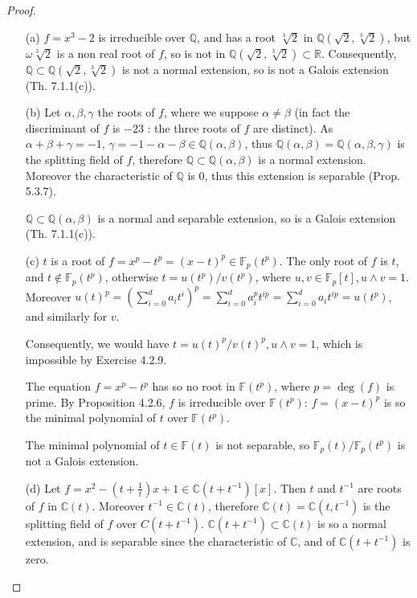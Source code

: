 \documentclass[11pt,a4paper]{article}
\newcommand{\Q}{\mathbb{Q}}
\newcommand{\R}{\mathbb{R}}
\newcommand{\C}{\mathbb{C}}
\newcommand{\F}{\mathbb{F}}
\begin{document}
\begin{proof}
\begin{enumerate}
\item[(a)]
$f = x^3-2$ is  irreducible over $\Q$, and has a root $\sqrt[3]{2}$ in $\Q(\sqrt{2},\sqrt[3]{2})$, but $\omega \sqrt[3]{2}$ is a non real root of $f$, so is not in $\Q(\sqrt{2},\sqrt[3]{2}) \subset \R$. Consequently, $\Q \subset \Q(\sqrt{2},\sqrt[3]{2})$ is not a normal extension, so is not a Galois extension (Th. 7.1.1(c)).

\item[(b)]
Let  $\alpha,\beta,\gamma$ the roots of $f$, where we suppose $\alpha \neq \beta $ (in fact the discriminant of $f$ is $-23$ : the three roots of $f$ are distinct). As $\alpha+\beta+\gamma = -1$, $\gamma = -1 - \alpha - \beta \in \Q(\alpha,\beta)$, thus $\Q(\alpha,\beta) = \Q(\alpha,\beta,\gamma)$ is the splitting field of $f$, therefore  $\Q \subset \Q(\alpha,\beta)$ is a normal extension. Moreover the characteristic of $\Q$ is 0, thus this extension is separable (Prop. 5.3.7).

$\Q \subset \Q(\alpha,\beta)$ is a normal and separable extension, so is a Galois extension (Th. 7.1.1(c)).

\item[(c)]$t$ is a root of $f = x^p-t^p = (x-t)^p\in \F_p(t^p)$.
The only root of $f$ is $t$, and $t \not \in \F_p(t^p)$, otherwise $t = u(t^p)/v(t^p)$, where $u,v \in \F_p[t], u \wedge v= 1$. Moreover $u(t)^p = (\sum_{i=0}^d a_i t^i)^p = \sum_{i=0}^d a_i^p t^{ip} = \sum_{i=0}^da_i t^{ip} = u(t^p)$, and similarly for $v$.

Consequently, we would have $t= u(t)^p/v(t)^p,u\wedge v = 1$, which is impossible by Exercise 4.2.9.

The equation $f = x^p - t^p$ has so no root in $\F(t^p)$, where $p =\deg(f)$ is prime. By Proposition 4.2.6, $f$ is irreducible over $\F(t^p)$: $f = (x-t)^p$ is so the minimal polynomial of $t$ over $\F(t^p)$.

The minimal polynomial of $t \in \F(t)$ is not separable, so $\F_p(t)/\F_p(t^p)$ is not a Galois extension.

\item[(d)]
Let $f = x^2-\left(t+\frac{1}{t}\right)x + 1 \in \C(t+t^{-1})[x]$. Then  $t$ and $t^{-1}$ are roots of $f$ in  $\C(t)$. Moreover $t^{-1} \in \C(t)$, therefore $\C(t) = \C(t,t^{-1})$ is the splitting field of $f$ over $C(t+t^{-1})$. $ \C(t+t^{-1}) \subset \C(t)$ is so a normal extension, and is separable since the characteristic of $\C$, and of $\C(t+t^{-1})$ is zero. 


\end{enumerate}
\end{proof}
\end{document}
